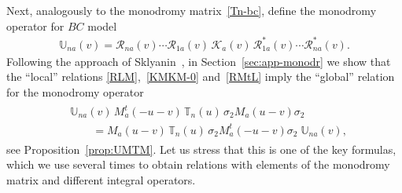 \documentclass[11pt]{article}
\numberwithin{equation}{section}
\theoremstyle{plain}
\theoremstyle{definition}
\newcommand{\T}{\mathbb{T}}
\newcommand{\MMO}{\mathbb{U}}
\begin{document}
Next, analogously to the monodromy matrix~\eqref{Tn-bc}, define the monodromy operator for $BC$ model
\begin{align}\label{mon-op-BC}
	\MMO_{na}(v) = \mathcal{R}_{n a}(v) \cdots \mathcal{R}_{1 a}(v) \, \mathcal{K}_a(v) \, \mathcal{R}^*_{1 a}(v) \cdots \mathcal{R}^*_{n a}(v).
\end{align}
Following the approach of Sklyanin~\cite{Skl}, in Section~\ref{sec:app-monodr} we show that the ``local'' relations \eqref{RLM},~\eqref{KMKM-0} and~\eqref{RMtL} imply the ``global'' relation for the monodromy operator
\begin{align}\label{UMTM-0}
	\begin{aligned}
		& \MMO_{na}(v) \, M_a^t(- u - v) \, \T_n(u) \, \sigma_2 M_a(u - v) \sigma_2 \\[6pt]
		& \quad\quad = M_a(u - v) \, \T_n(u) \, \sigma_2 M_a^t(-u -v) \sigma_2 \; \MMO_{na}(v),
	\end{aligned}
\end{align}
see Proposition~\ref{prop:UMTM}. Let us stress that this is one of the key formulas, which we use several times to obtain relations with elements of the monodromy matrix and different integral operators.
\end{document}

